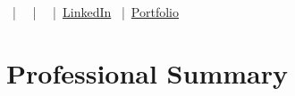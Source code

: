 \documentclass[11pt, letterpaper]{article}
\begin{document}
\begin{center}
    {\huge\bfseries\color{primary} } \\ \vspace{0.3em}
    \ifx\relax\relax\else
    {\large\color{secondary} } \\ \vspace{0.3em}
    \fi
    {\small\color{secondary}
    \ifx\relax\relax\else\href{mailto:}{}\fi
    \ifx\relax\relax\else\ |\ \fi
    \ifx\relax\relax\else\ |\ \fi
    \ifx\relax\relax\else\ |\ \href{}{LinkedIn}\fi
    \ifx\relax\relax\else\ |\ \href{}{Portfolio}\fi
    }
\end{center}

\ifx\relax\relax\else
\section*{Professional Summary}

\fi




\end{document}
